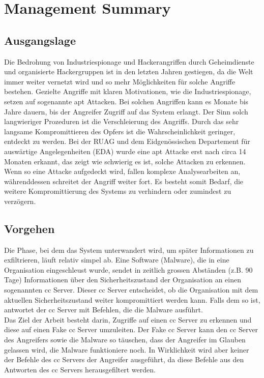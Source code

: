 \chapter{Management Summary}
\section{Ausgangslage}
Die Bedrohung von Industriespionage und Hackerangriffen durch Geheimdienste und organisierte Hackergruppen ist in den letzten Jahren gestiegen, da die Welt immer weiter vernetzt wird und so mehr Möglichkeiten für solche Angriffe bestehen. Gezielte Angriffe mit klaren Motivationen, wie die Industriespionage, setzen auf sogenannte \gls{apt} Attacken. Bei solchen Angriffen kann es Monate bis Jahre dauern, bis der Angreifer Zugriff auf das System erlangt. Der Sinn solch langwieriger Prozeduren ist die Verschleierung des Angriffs. Durch das sehr langsame Kompromittieren des Opfers ist die Wahrscheinlichkeit geringer, entdeckt zu werden. Bei der RUAG und dem Eidgenössischen Departement für auswärtige Angelegenheiten (EDA) wurde eine \gls{apt} Attacke erst nach circa 14 Monaten erkannt, das zeigt wie schwierig es ist, solche Attacken zu erkennen. Wenn so eine Attacke aufgedeckt wird, fallen komplexe Analysearbeiten an, währenddessen schreitet der Angriff weiter fort. Es besteht somit Bedarf, die weitere Kompromittierung des Systems zu verhindern oder zumindest zu verzögern.

\section{Vorgehen}
Die Phase, bei dem das System unterwandert wird, um später Informationen zu exfiltrieren, läuft relativ simpel ab. Eine Software (Malware), die in eine Organisation eingeschleust wurde, sendet in zeitlich grossen Abständen (z.B. 90 Tage) Informationen über den Sicherheitszustand der Organisation an einen sogenannten \gls{cc} Server. Dieser \gls{cc} Server entscheidet, ob die Organisation mit dem aktuellen Sicherheitszustand weiter kompromittiert werden kann. Falls dem so ist, antwortet der \gls{cc} Server mit Befehlen, die die Malware ausführt.\\

Das Ziel der Arbeit besteht darin, Zugriffe auf einen \gls{cc} Server zu erkennen und diese auf einen Fake \gls{cc} Server umzuleiten. Der Fake \gls{cc} Server kann den \gls{cc} Server des Angreifers sowie die Malware so täuschen, dass der Angreifer im Glauben gelassen wird, die Malware funktioniere noch. In Wirklichkeit wird aber keiner der Befehle des \gls{cc} Servers der Angreifer ausgeführt, da diese Befehle aus den Antworten des \gls{cc} Servers herausgefiltert werden.

